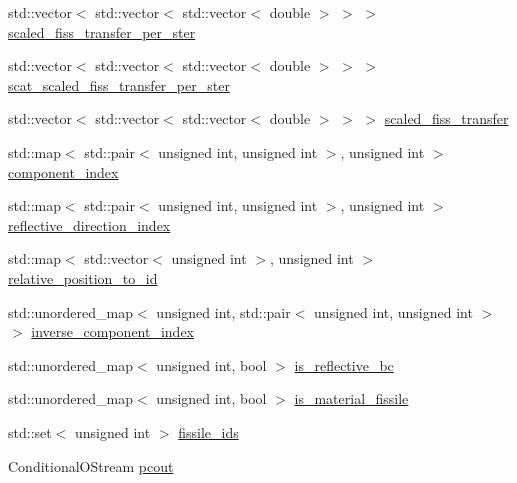 \begin{DoxyCompactItemize}
\item 
std\+::vector$<$ std\+::vector$<$ std\+::vector$<$ double $>$ $>$ $>$ \hyperlink{class_equation_base_a5452991f01541261dba1e0322a0f5392}{scaled\+\_\+fiss\+\_\+transfer\+\_\+per\+\_\+ster}
\item 
std\+::vector$<$ std\+::vector$<$ std\+::vector$<$ double $>$ $>$ $>$ \hyperlink{class_equation_base_ad445f7f2e377cc05f2003de4d632baa7}{scat\+\_\+scaled\+\_\+fiss\+\_\+transfer\+\_\+per\+\_\+ster}
\item 
std\+::vector$<$ std\+::vector$<$ std\+::vector$<$ double $>$ $>$ $>$ \hyperlink{class_equation_base_aadf1651f816a1a65301faac3cd075aeb}{scaled\+\_\+fiss\+\_\+transfer}
\item 
std\+::map$<$ std\+::pair$<$ unsigned int, unsigned int $>$, unsigned int $>$ \hyperlink{class_equation_base_a7e2b3d305d1f1f7799acff6c86bc67f8}{component\+\_\+index}
\item 
std\+::map$<$ std\+::pair$<$ unsigned int, unsigned int $>$, unsigned int $>$ \hyperlink{class_equation_base_a55a37edb6a0cc2ac25e31b4e8aa91e33}{reflective\+\_\+direction\+\_\+index}
\item 
std\+::map$<$ std\+::vector$<$ unsigned int $>$, unsigned int $>$ \hyperlink{class_equation_base_a53b48062132ee777856a3b340b4000b2}{relative\+\_\+position\+\_\+to\+\_\+id}
\item 
std\+::unordered\+\_\+map$<$ unsigned int, std\+::pair$<$ unsigned int, unsigned int $>$ $>$ \hyperlink{class_equation_base_a1d2e520638913dfeb4e16f3a09911836}{inverse\+\_\+component\+\_\+index}
\item 
std\+::unordered\+\_\+map$<$ unsigned int, bool $>$ \hyperlink{class_equation_base_a91757532b2fd3759a976b22a83a9f8d8}{is\+\_\+reflective\+\_\+bc}
\item 
std\+::unordered\+\_\+map$<$ unsigned int, bool $>$ \hyperlink{class_equation_base_a2568ffad6a52d3bf3227eea51a314cb4}{is\+\_\+material\+\_\+fissile}
\item 
std\+::set$<$ unsigned int $>$ \hyperlink{class_equation_base_aafa902bf78cf78770557098fa9027188}{fissile\+\_\+ids}
\item 
Conditional\+O\+Stream \hyperlink{class_equation_base_a12dd28de05c41d4dd3ec30e7195bfa97}{pcout}
\end{DoxyCompactItemize}
